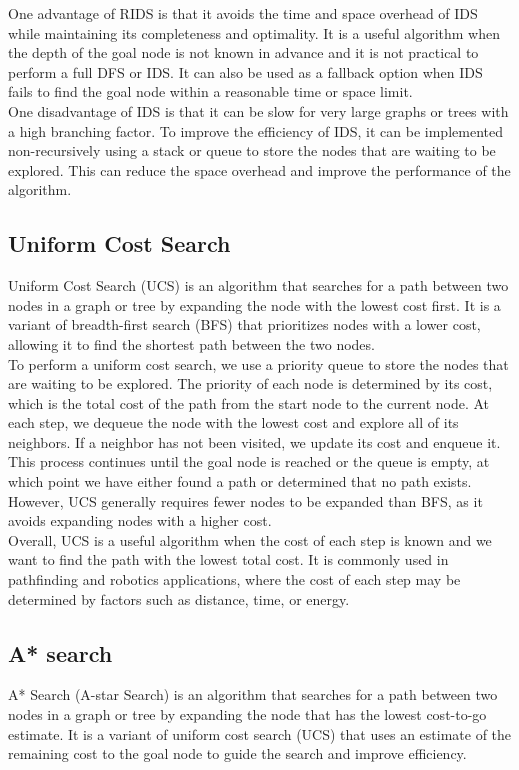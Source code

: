 \documentclass[12pt]{article}
\begin{document}
One advantage of RIDS is that it avoids the time and space overhead of IDS while maintaining its completeness and optimality. It is a useful algorithm when the depth of the goal node is not known in advance and it is not practical to perform a full DFS or IDS. It can also be used as a fallback option when IDS fails to find the goal node within a reasonable time or space limit.\\

One disadvantage of IDS is that it can be slow for very large graphs or trees with a high branching factor. To improve the efficiency of IDS, it can be implemented non-recursively using a stack or queue to store the nodes that are waiting to be explored. This can reduce the space overhead and improve the performance of the algorithm.

\subsection{Uniform Cost Search} 
Uniform Cost Search (UCS) is an algorithm that searches for a path between two nodes in a graph or tree by expanding the node with the lowest cost first. It is a variant of breadth-first search (BFS) that prioritizes nodes with a lower cost, allowing it to find the shortest path between the two nodes.\\

To perform a uniform cost search, we use a priority queue to store the nodes that are waiting to be explored. The priority of each node is determined by its cost, which is the total cost of the path from the start node to the current node. At each step, we dequeue the node with the lowest cost and explore all of its neighbors. If a neighbor has not been visited, we update its cost and enqueue it. This process continues until the goal node is reached or the queue is empty, at which point we have either found a path or determined that no path exists. However, UCS generally requires fewer nodes to be expanded than BFS, as it avoids expanding nodes with a higher cost.\\

Overall, UCS is a useful algorithm when the cost of each step is known and we want to find the path with the lowest total cost. It is commonly used in pathfinding and robotics applications, where the cost of each step may be determined by factors such as distance, time, or energy.

\subsection{A* search}
A* Search (A-star Search) is an algorithm that searches for a path between two nodes in a graph or tree by expanding the node that has the lowest cost-to-go estimate. It is a variant of uniform cost search (UCS) that uses an estimate of the remaining cost to the goal node to guide the search and improve efficiency.\\
\end{document}
